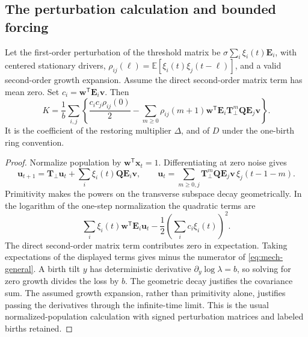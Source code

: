 \subsection{The perturbation calculation and bounded forcing}\label{app:mech-general}
\begin{lemma}\label{lem:mech-general}
Let the first-order perturbation of the threshold matrix be \(\sigma\sum_i\xi_i(t)\mathbf E_i\), with centered stationary drivers, \(\rho_{ij}(\ell)=\mathbb E[\xi_i(t)\xi_j(t-\ell)]\), and a valid second-order growth expansion. Assume the direct second-order matrix term has mean zero. Set \(c_i=\mathbf w^{\mathsf T}\mathbf E_i\mathbf v\). Then
\begin{equation}\label{eq:mech-general}
 K=\frac1b\sum_{i,j}\left\{\frac{c_ic_j\rho_{ij}(0)}2-
 \sum_{m\geq0}\rho_{ij}(m+1)\mathbf w^{\mathsf T}\mathbf E_i
 \mathbf T_\perp^m\mathbf Q\mathbf E_j\mathbf v\right\}.
\end{equation}
It is the coefficient of the restoring multiplier \(\Delta\), and of \(D\) under the one-birth ring convention.
\end{lemma}
\begin{proof}
Normalize population by \(\mathbf w^{\mathsf T}\mathbf x_t=1\). Differentiating at zero noise gives
\[
 \mathbf u_{t+1}=\mathbf T_\perp\mathbf u_t+
 \sum_i\xi_i(t)\mathbf Q\mathbf E_i\mathbf v,
 \qquad
 \mathbf u_t=\sum_{m\geq0,j}\mathbf T_\perp^m\mathbf Q\mathbf E_j\mathbf v\,
 \xi_j(t-1-m).
\]
Primitivity makes the powers on the transverse subspace decay geometrically. In the logarithm of the one-step normalization the quadratic terms are
\[
 \sum_i\xi_i(t)\mathbf w^{\mathsf T}\mathbf E_i\mathbf u_t
 -\frac12\left(\sum_ic_i\xi_i(t)\right)^2.
\]
The direct second-order matrix term contributes zero in expectation. Taking expectations of the displayed terms gives minus the numerator of \eqref{eq:mech-general}. A birth tilt \(y\) has deterministic derivative \(\partial_y\log\lambda=b\), so solving for zero growth divides the loss by \(b\). The geometric decay justifies the covariance sum. The assumed growth expansion, rather than primitivity alone, justifies passing the derivatives through the infinite-time limit. This is the usual normalized-population calculation \citep{tuljapurkar1982a,tuljapurkar1990} with signed perturbation matrices and labeled births retained.
\end{proof}

